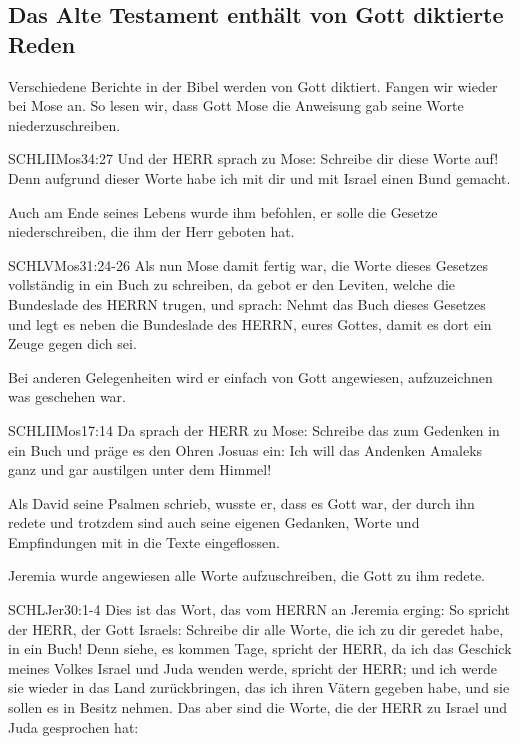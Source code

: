 \subsection{Das Alte Testament enthält von Gott diktierte Reden}
Verschiedene Berichte in der Bibel werden von Gott diktiert. Fangen wir wieder bei Mose an. So lesen wir, dass Gott Mose die Anweisung gab seine Worte niederzuschreiben.
\begin{bibelquote}{SCHL}{IIMos}{34:27}
  Und der HERR sprach zu Mose: Schreibe dir diese Worte auf! Denn aufgrund dieser Worte habe ich mit dir und mit Israel einen Bund gemacht.
\end{bibelquote}
Auch am Ende seines Lebens wurde ihm befohlen, er solle die Gesetze niederschreiben, die ihm der Herr geboten hat. 
\begin{bibelquote}{SCHL}{VMos}{31:24-26}
  Als nun Mose damit fertig war, die Worte dieses Gesetzes vollständig in ein Buch zu schreiben, da gebot er den Leviten, welche die Bundeslade des HERRN trugen, und sprach: Nehmt das Buch dieses Gesetzes und legt es neben die Bundeslade des HERRN, eures Gottes, damit es dort ein Zeuge gegen dich sei.
\end{bibelquote}
Bei anderen Gelegenheiten wird er einfach von Gott angewiesen, aufzuzeichnen was geschehen war. 
\begin{bibelquote}{SCHL}{IIMos}{17:14}
  Da sprach der HERR zu Mose: Schreibe das zum Gedenken in ein Buch und präge es den Ohren Josuas ein: Ich will das Andenken Amaleks ganz und gar austilgen unter dem Himmel!
\end{bibelquote}
Als David seine Psalmen schrieb, wusste er, dass es Gott war, der durch ihn redete und trotzdem sind auch seine eigenen Gedanken, Worte und Empfindungen mit in die Texte eingeflossen.

Jeremia wurde angewiesen alle Worte aufzuschreiben, die Gott zu ihm redete.
\begin{bibelquote}{SCHL}{Jer}{30:1-4}
  Dies ist das Wort, das vom HERRN an Jeremia erging: So spricht der HERR, der Gott Israels: Schreibe dir alle Worte, die ich zu dir geredet habe, in ein Buch! Denn siehe, es kommen Tage, spricht der HERR, da ich das Geschick meines Volkes Israel und Juda wenden werde, spricht der HERR; und ich werde sie wieder in das Land zurückbringen, das ich ihren Vätern gegeben habe, und sie sollen es in Besitz nehmen. Das aber sind die Worte, die der HERR zu Israel und Juda gesprochen hat:
\end{bibelquote}

